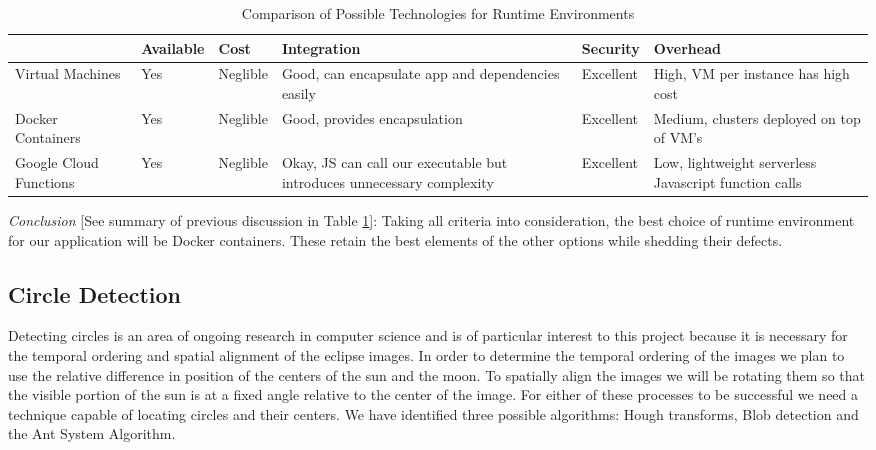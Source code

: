 \documentclass[10pt, onecolumn, draftclsnofoot, letterpaper, compsoc]{IEEEtran}
\begin{document}
\begin{table}[h]
\centering
\caption{Comparison of Possible Technologies for Runtime Environments}
\begin{tabular}{|p{2.1cm}|p{2.1cm}|p{2.1cm}|p{2.1cm}|p{2.1cm}|p{2.1cm}|}
\cline{4-4}

\hline  & Available & Cost & Integration & Security & Overhead \\ \hline

Virtual Machines & Yes & Neglible & Good, can encapsulate app and dependencies
easily &  Excellent & High, VM per instance has high cost  \\ \hline

Docker Containers  & Yes & Neglible & Good, provides encapsulation &  Excellent
& Medium, clusters deployed on top of VM’s  \\ \hline

Google Cloud Functions  & Yes & Neglible & Okay, JS can call our executable but
introduces unnecessary complexity & Excellent & Low, lightweight serverless
Javascript function calls  \\ \hline

\end{tabular}
\label{table:george2}
\end{table}

\textit{Conclusion} [See summary of previous discussion in Table
\ref{table:george2}]: Taking all criteria into consideration, the best choice of runtime environment
for our application will be Docker containers. These retain the best elements of
the other options while shedding their defects. \\

\subsection{Circle Detection}

Detecting circles is an area of ongoing research in computer science and is of
particular interest to this project because it is necessary for the temporal
ordering and spatial alignment of the eclipse images. In order to determine the
temporal ordering of the images we plan to use the relative difference in
position of the centers of the sun and the moon. To spatially align the images
we will be rotating them so that the visible portion of the sun is at a fixed
angle relative to the center of the image. For either of these processes to be
successful we need a technique capable of locating circles and their centers. We
have identified three possible algorithms: Hough transforms, Blob detection and
the Ant System Algorithm. \\
\end{document}
